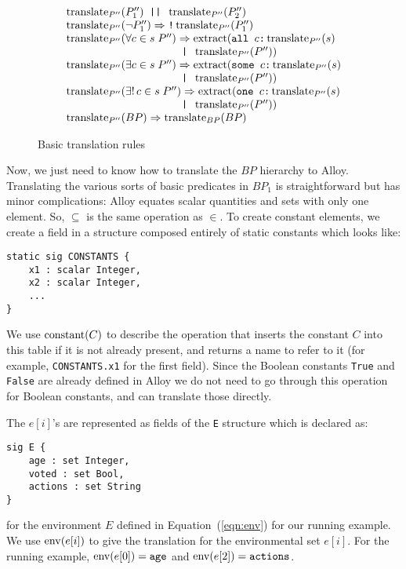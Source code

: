 \begin{figure}[t]
\[\begin{array}{l}
  \translation_{P''} (P''_1) \mtt{ || } \translation_{P''} (P''_2) \nonumber \\
  \translation_{P''} (\neg P''_1) \Rightarrow  
  \mtt{!} \translation_{P''} (P''_1) \nonumber \\
  \translation_{P''} (\forall c \in s \; P'') \Rightarrow 
  \extract(\mtt{all } c \mtt{:} \translation_{P''} (s) \\
   \qquad \qquad \qquad \qquad \qquad \mtt{ | }
  \translation_{P''} (P'')) \\ %
  \translation_{P''} (\exists c \in s \; P'') \Rightarrow 
  \extract(\mtt{some } c \mtt{:} \translation_{P''} (s) \\
   \qquad \qquad \qquad \qquad \qquad \mtt{ | }
  \translation_{P''} (P'')) \nonumber \\
  \translation_{P''} (\exists ! \, c \in s \; P'') \Rightarrow 
  \extract(\mtt{one } c \mtt{:} \translation_{P''} (s) \\
  \qquad \qquad \qquad \qquad \qquad \mtt{ | }
  \translation_{P''} (P'')) \nonumber \\
  \translation_{P''} (BP) \Rightarrow  \translation_{BP} (BP) \nonumber
\end{array}
\]
\caption{Basic translation rules}
\label{fig:alloy-translation}
\end{figure}

Now, we just need to know how to translate the $BP$ hierarchy to
Alloy.  Translating the various sorts of basic predicates in $BP_1$ is
straightforward but has minor complications: Alloy equates scalar
quantities and sets with only one element. So, $\subseteq$ is the same
operation as $\in$. To create constant elements, we create a field in
a structure composed entirely of static constants which looks like:
\begin{verbatim}
static sig CONSTANTS {
    x1 : scalar Integer,
    x2 : scalar Integer,
    ...
}
\end{verbatim}
We use $\operatorname{constant} (C)$ to describe the operation that inserts the
constant $C$ into this table if it is not already present, and returns
a name to refer to it (for example, \texttt{CONSTANTS.x1} for the
first field).  Since the Boolean constants \texttt{True} and
\texttt{False} are already defined in Alloy we do not need to go
through this operation for Boolean constants, and can translate those
directly.

The $e[i]$'s are represented as fields of the \texttt{E} structure
which is declared as:
\begin{verbatim}
sig E {
    age : set Integer,
    voted : set Bool,
    actions : set String
}
\end{verbatim}
for the environment $E$ defined in Equation~(\ref{eqn:env}) for our
running example.  We use $\operatorname{env} (e[i])$ to give the translation for the
environmental set $e[i]$. For the running example, $\operatorname{env} (e[0]) =
\text{\texttt{age}}$ and $\operatorname{env} (e[2]) = \text{\texttt{actions}}$.

